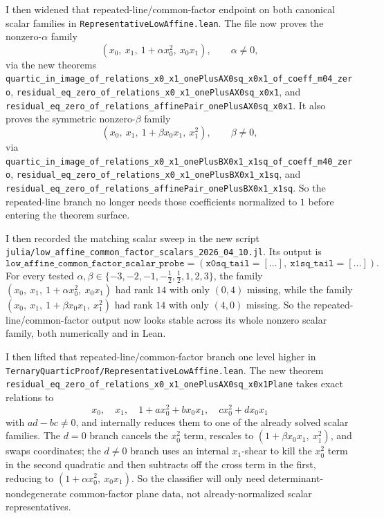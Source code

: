 \documentclass[11pt]{article}
\begin{document}
I then widened that repeated-line/common-factor endpoint on both canonical
scalar families in \texttt{RepresentativeLowAffine.lean}. The file now proves
the nonzero-\(\alpha\) family
\[
  (x_0,\ x_1,\ 1 + \alpha x_0^2,\ x_0x_1),\qquad \alpha \neq 0,
\]
via the new theorems
\texttt{quartic\_in\_image\_of\_relations\_x0\_x1\_onePlusAX0sq\_x0x1\_of\_coeff\_m04\_zero},
\texttt{residual\_eq\_zero\_of\_relations\_x0\_x1\_onePlusAX0sq\_x0x1}, and
\texttt{residual\_eq\_zero\_of\_relations\_affinePair\_onePlusAX0sq\_x0x1}.
It also proves the symmetric nonzero-\(\beta\) family
\[
  (x_0,\ x_1,\ 1 + \beta x_0x_1,\ x_1^2),\qquad \beta \neq 0,
\]
via
\texttt{quartic\_in\_image\_of\_relations\_x0\_x1\_onePlusBX0x1\_x1sq\_of\_coeff\_m40\_zero},
\texttt{residual\_eq\_zero\_of\_relations\_x0\_x1\_onePlusBX0x1\_x1sq}, and
\texttt{residual\_eq\_zero\_of\_relations\_affinePair\_onePlusBX0x1\_x1sq}.
So the repeated-line branch no longer needs those coefficients normalized to
\(1\) before entering the theorem surface.

I then recorded the matching scalar sweep in the new script
\texttt{julia/low\_affine\_common\_factor\_scalars\_2026\_04\_10.jl}. Its
output is
\[
\texttt{low\_affine\_common\_factor\_scalar\_probe}
= (\texttt{x0sq\_tail} = [\dots],\ \texttt{x1sq\_tail} = [\dots]).
\]
For every tested
\(\alpha,\beta \in \{-3,-2,-1,-\tfrac12,\tfrac12,1,2,3\}\), the family
\((x_0,\ x_1,\ 1+\alpha x_0^2,\ x_0x_1)\) had rank \(14\) with only
\((0,4)\) missing, while the family
\((x_0,\ x_1,\ 1+\beta x_0x_1,\ x_1^2)\) had rank \(14\) with only
\((4,0)\) missing. So the repeated-line/common-factor output now looks stable
across its whole nonzero scalar family, both numerically and in Lean.

I then lifted that repeated-line/common-factor branch one level higher in
\texttt{TernaryQuarticProof/RepresentativeLowAffine.lean}. The new theorem
\texttt{residual\_eq\_zero\_of\_relations\_x0\_x1\_onePlusAX0sq\_x0x1Plane}
takes exact relations to
\[
  x_0,\quad x_1,\quad 1 + a x_0^2 + b x_0x_1,\quad c x_0^2 + d x_0x_1
\]
with \(ad-bc \neq 0\), and internally reduces them to one of the already solved
scalar families. The \(d=0\) branch cancels the \(x_0^2\) term, rescales to
\((1+\beta x_0x_1,\ x_1^2)\), and swaps coordinates; the \(d \neq 0\) branch
uses an internal \(x_1\)-shear to kill the \(x_0^2\) term in the second
quadratic and then subtracts off the cross term in the first, reducing to
\((1+\alpha x_0^2,\ x_0x_1)\). So the classifier will only need determinant-nondegenerate
common-factor plane data, not already-normalized scalar representatives.
\end{document}

